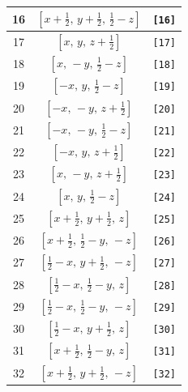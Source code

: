 \documentclass[fleqn,8pt]{jsarticle}
\begin{document}
\begin{longtable}{ccc}
16 & $\left[ x + \frac{1}{2},\, y + \frac{1}{2},\, \frac{1}{2} - z \right]$ & {\tt [16]} \\ \hline
17 & $\left[ x,\, y,\, z + \frac{1}{2} \right]$ & {\tt [17]} \\ \hline
18 & $\left[ x,\, - y,\, \frac{1}{2} - z \right]$ & {\tt [18]} \\ \hline
19 & $\left[ - x,\, y,\, \frac{1}{2} - z \right]$ & {\tt [19]} \\ \hline
20 & $\left[ - x,\, - y,\, z + \frac{1}{2} \right]$ & {\tt [20]} \\ \hline
21 & $\left[ - x,\, - y,\, \frac{1}{2} - z \right]$ & {\tt [21]} \\ \hline
22 & $\left[ - x,\, y,\, z + \frac{1}{2} \right]$ & {\tt [22]} \\ \hline
23 & $\left[ x,\, - y,\, z + \frac{1}{2} \right]$ & {\tt [23]} \\ \hline
24 & $\left[ x,\, y,\, \frac{1}{2} - z \right]$ & {\tt [24]} \\ \hline
25 & $\left[ x + \frac{1}{2},\, y + \frac{1}{2},\, z \right]$ & {\tt [25]} \\ \hline
26 & $\left[ x + \frac{1}{2},\, \frac{1}{2} - y,\, - z \right]$ & {\tt [26]} \\ \hline
27 & $\left[ \frac{1}{2} - x,\, y + \frac{1}{2},\, - z \right]$ & {\tt [27]} \\ \hline
28 & $\left[ \frac{1}{2} - x,\, \frac{1}{2} - y,\, z \right]$ & {\tt [28]} \\ \hline
29 & $\left[ \frac{1}{2} - x,\, \frac{1}{2} - y,\, - z \right]$ & {\tt [29]} \\ \hline
30 & $\left[ \frac{1}{2} - x,\, y + \frac{1}{2},\, z \right]$ & {\tt [30]} \\ \hline
31 & $\left[ x + \frac{1}{2},\, \frac{1}{2} - y,\, z \right]$ & {\tt [31]} \\ \hline
32 & $\left[ x + \frac{1}{2},\, y + \frac{1}{2},\, - z \right]$ & {\tt [32]} \\
\end{longtable}
\end{document}
